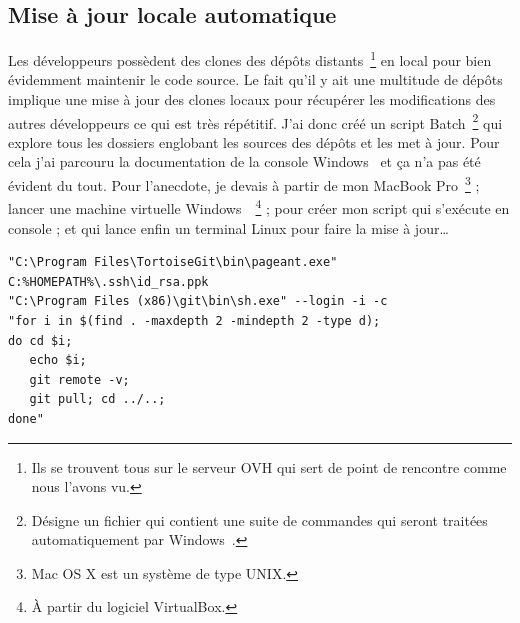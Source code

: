 \subsection{Mise à jour locale automatique} %
\label{sub:Mise à jour locale automatique}

Les développeurs possèdent des clones des dépôts distants\,
\footnote{Ils se trouvent tous sur le serveur OVH qui sert de point de
rencontre comme nous l'avons vu.} en local pour bien évidemment
maintenir le code source. Le fait qu'il y ait une multitude de dépôts
implique une mise à jour des clones locaux pour récupérer les
modifications des autres développeurs ce qui est très répétitif. J'ai
donc créé un script Batch\, \footnote{Désigne un fichier qui contient
une suite de commandes qui seront traitées automatiquement par
Windows~\textregistered.} qui explore tous les dossiers englobant les
sources des dépôts et les met à jour. Pour cela j'ai parcouru la
documentation de la console Windows~\textregistered{} et ça n'a pas été
évident du tout. Pour l'anecdote, je devais à partir de mon MacBook
Pro\, \footnote{Mac OS X est un système de type UNIX.} ; lancer une
machine virtuelle Windows~\textregistered\, \footnote{À partir du
logiciel VirtualBox.} ; pour créer mon script qui s'exécute en console ;
et qui lance enfin un terminal Linux pour faire la mise à jour\dots\\

\begin{lstlisting}[basicstyle=\ttfamily\small, frame=trBL]
"C:\Program Files\TortoiseGit\bin\pageant.exe"
C:%HOMEPATH%\.ssh\id_rsa.ppk
"C:\Program Files (x86)\git\bin\sh.exe" --login -i -c
"for i in $(find . -maxdepth 2 -mindepth 2 -type d);
do cd $i;
   echo $i;
   git remote -v;
   git pull; cd ../..;
done"
\end{lstlisting}
